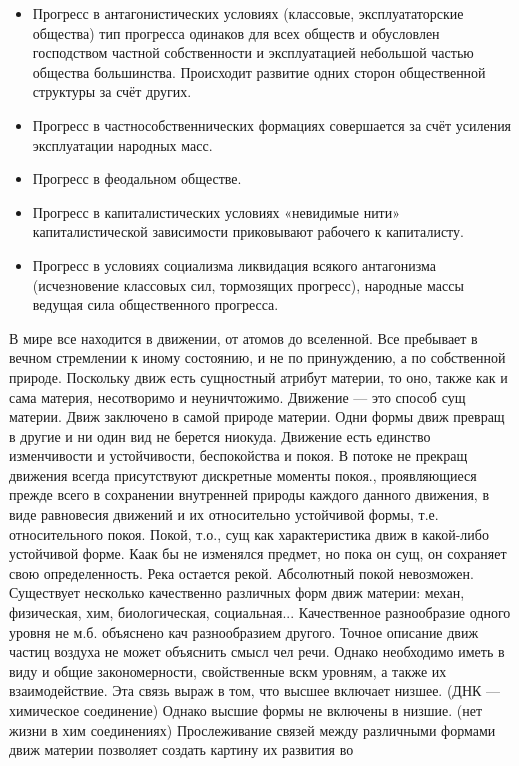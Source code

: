 \documentclass[12pt]{article}
\begin{document}
\begin{itemize}
  \item Прогресс в антагонистических условиях (классовые, эксплуататорские общества) тип прогресса одинаков для
всех обществ и обусловлен господством частной собственности и эксплуатацией небольшой частью общества
большинства. Происходит развитие одних сторон общественной структуры за счёт других.
\item Прогресс в частнособственнических формациях совершается за счёт усиления эксплуатации народных масс.
\item Прогресс в феодальном обществе.
\item Прогресс в капиталистических условиях «невидимые нити» капиталистической зависимости приковывают
рабочего к капиталисту.
\item Прогресс в условиях социализма ликвидация всякого антагонизма (исчезновение классовых сил, тормозящих
прогресс), народные массы ведущая сила общественного прогресса.
\end{itemize}
В мире все находится в движении, от атомов до вселенной. Все пребывает в вечном стремлении к иному
состоянию,  и  не  по  принуждению,  а  по  собственной  природе.  Поскольку  движ  есть  сущностный  атрибут
материи, то оно, также как и сама материя, несотворимо и неуничтожимо. Движение --- это способ сущ материи.
Движ заключено в самой природе материи. Одни формы движ превращ в другие и ни один вид не берется
ниокуда. 
Движение есть единство изменчивости и устойчивости, беспокойства и покоя. В потоке не прекращ движения
всегда  присутствуют  дискретные  моменты  покоя.,  проявляющиеся  прежде  всего  в  сохранении  внутренней
природы каждого данного движения, в виде равновесия движений и их относительно устойчивой формы, т.е.
относительного покоя. Покой, т.о., сущ как характеристика движ в какой-либо устойчивой форме. Каак бы не
изменялся предмет, но пока он сущ, он сохраняет свою определенность. Река остается рекой.
Абсолютный покой невозможен.
Существует несколько качественно различных форм движ материи: механ, физическая, хим, биологическая,
социальная... Качественное разнообразие одного уровня не м.б. объяснено кач разнообразием другого. Точное
описание движ частиц воздуха не может объяснить смысл чел речи. Однако необходимо иметь в виду и общие
закономерности, свойственные вскм уровням, а также их взаимодействие. Эта связь выраж в том, что высшее
включает низшее. (ДНК --- химическое соединение) Однако высшие формы не включены в низшие. (нет жизни в хим
соединениях)
Прослеживание связей между различными формами движ материи позволяет создать картину их развития во
\end{document}
